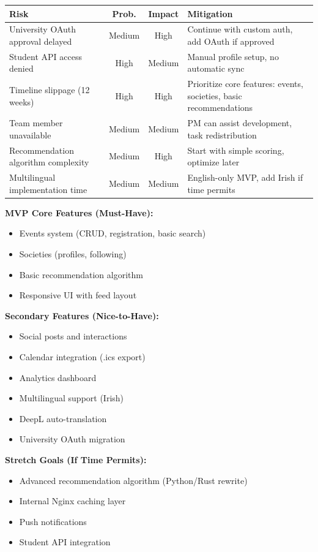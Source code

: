 \documentclass[12pt,a4paper]{article}
\begin{document}
\begin{table}[h]
\centering
\begin{tabular}{|p{4cm}|c|c|p{5cm}|}
\hline
\textbf{Risk} & \textbf{Prob.} & \textbf{Impact} & \textbf{Mitigation} \\
\hline
University OAuth approval delayed & Medium & High & Continue with custom auth, add OAuth if approved \\
\hline
Student API access denied & High & Medium & Manual profile setup, no automatic sync \\
\hline
Timeline slippage (12 weeks) & High & High & Prioritize core features: events, societies, basic recommendations \\
\hline
Team member unavailable & Medium & Medium & PM can assist development, task redistribution \\
\hline
Recommendation algorithm complexity & Medium & High & Start with simple scoring, optimize later \\
\hline
Multilingual implementation time & Medium & Medium & English-only MVP, add Irish if time permits \\
\hline
\end{tabular}
\end{table}

\textbf{MVP Core Features (Must-Have):}
\begin{itemize}
    \item Events system (CRUD, registration, basic search)
    \item Societies (profiles, following)
    \item Basic recommendation algorithm
    \item Responsive UI with feed layout
\end{itemize}

\textbf{Secondary Features (Nice-to-Have):}
\begin{itemize}
    \item Social posts and interactions
    \item Calendar integration (.ics export)
    \item Analytics dashboard
    \item Multilingual support (Irish)
    \item DeepL auto-translation
    \item University OAuth migration
\end{itemize}

\textbf{Stretch Goals (If Time Permits):}
\begin{itemize}
    \item Advanced recommendation algorithm (Python/Rust rewrite)
    \item Internal Nginx caching layer
    \item Push notifications
    \item Student API integration
\end{itemize}
\end{document}

